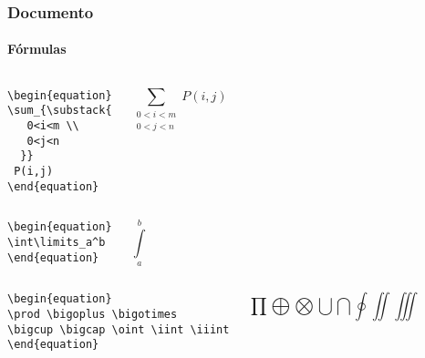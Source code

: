 \begin{frame}[fragile]
\frametitle{Documento}
\framesubtitle{Fórmulas}
  \scriptsize
  \begin{columns}[c]
  \begin{verbatim}
\begin{equation}
\sum_{\substack{
   0<i<m \\
   0<j<n
  }}
 P(i,j)
\end{equation}
  \end{verbatim}
  \begin{fmpage}{\textwidth}
\begin{equation}
\sum_{\substack{
   0<i<m \\
   0<j<n
  }}
 P(i,j)
\end{equation}
  \end{fmpage}
  \end{columns}

  \begin{columns}[c]
  \begin{verbatim}
\begin{equation}
\int\limits_a^b
\end{equation}
  \end{verbatim}
  \begin{fmpage}{\textwidth}
\begin{equation}
\int\limits_a^b
\end{equation}
  \end{fmpage}
  \end{columns}

  \begin{columns}[c]
  \begin{verbatim}
\begin{equation}
\prod \bigoplus \bigotimes 
\bigcup \bigcap \oint \iint \iiint
\end{equation}
  \end{verbatim}
  \begin{fmpage}{\textwidth}
\begin{equation}
\prod \bigoplus \bigotimes 
\bigcup \bigcap \oint \iint \iiint
\end{equation}
  \end{fmpage}
  \end{columns}
\end{frame}


